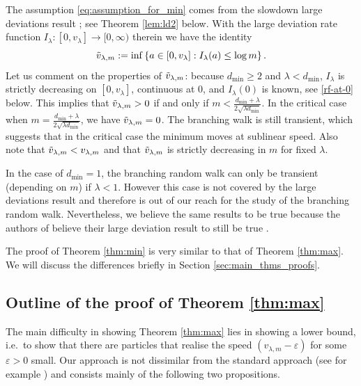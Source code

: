 \documentclass[11 pt]{article}
\theoremstyle{definition}
\numberwithin{equation}{section}
\newcommand{\eps}{\varepsilon}
\begin{document}
The assumption \eqref{eq:assumption_for_min} comes from the slowdown large deviations result \cite[Theorem 1.2]{DGPZ-ld}; see Theorem \ref{lem:ld2} below. With the large deviation rate function $I_{\lambda}\colon [0,v_{\lambda}] \to [0,\infty)$ therein we have the identity  
\begin{equation} \label{velocity-descr_min}
	\Tilde{v}_{\lambda, m}:= \inf\left\{a\in [0, v_{\lambda}]: I_{\lambda} (a) \le \log  m \right\} .
\end{equation}
Let us comment on the properties of $\Tilde{v}_{\lambda, m}$: because $d_{\min}\geq 2$ and $\lambda < d_{\min}$, $I_\lambda$ is strictly decreasing on $[0,v_\lambda]$, continuous at $0$, and $I_\lambda(0)$ is known, see \eqref{rf-at-0} below. This implies that $\Tilde{v}_{\lambda, m}>0$ if and only if $m < \frac{d_{\min}+\lambda}{2\sqrt{\lambda d_{\min}}}$. In the critical case when $m = \frac{d_{\min}+\lambda}{2\sqrt{\lambda d_{\min}}}$, we have $\Tilde{v}_{\lambda, m} = 0$. The branching walk is still transient, which suggests that in the critical case the minimum moves at sublinear speed. Also note that $\Tilde{v}_{\lambda,m} < v_{\lambda,m}$ and that $\Tilde{v}_{\lambda,m}$ is strictly decreasing in $m$ for fixed $\lambda$.

In the case of $d_{\min} = 1$, the branching random walk can only be transient (depending on $m$) if $\lambda < 1$. However this case is not covered by the large deviations result and therefore is out of our reach for the study of the branching random walk. Nevertheless, we believe the same results to be true because the authors of \cite{DGPZ-ld} believe their large deviation result to still be true \cite[Section 7, comment 1]{DGPZ-ld}.

The proof of Theorem \ref{thm:min} is very similar to that of Theorem \ref{thm:max}. We will discuss the differences briefly in Section \ref{sec:main_thms_proofs}.


\subsection{Outline of the proof of Theorem \ref{thm:max}}\label{Outline}

The main difficulty in showing Theorem \ref{thm:max} lies in showing a lower bound, i.e.\ to show that there are particles that realise the speed $(v_{\lambda,m}-\eps)$ for some $\eps>0$ small. Our approach is not dissimilar from the standard approach (see for example \cite[Section 1.4]{shi_branching_2015}) and consists mainly of the following two propositions. 
\end{document}
